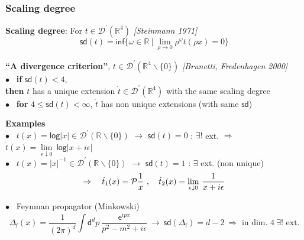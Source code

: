 \documentclass[9pt]{beamer}
\newcommand{\abs}[1]{\left|{#1}\right|} %
\newcommand{\E}{\mathsf{e}} %
\newcommand{\logar}{\mathsf{log}} %
\renewcommand{\inf}{\mathsf{inf}} %
\newcommand{\sd}{\mathsf{sd}} %
\newcommand{\citebeam}[1]{\textit{\textcolor{black!60!white}{[#1]}}} %
\newcommand{\Dcal}{\mathcal{D}}
\newcommand{\Pcal}{\mathcal{P}}
\newcommand{\Rbb}{\mathbb{R}}
\newcommand{\dsf}{\mathsf{d}}
\newcommand{\fsf}{\mathsf{f}}
\begin{document}

\begin{frame}

\frametitle{Scaling degree}

\vfill

\textbf{Scaling degree}: For $t \in \Dcal^\prime(\Rbb^4)$ \citebeam{Steinmann 1971} 
\\[-15pt]
\begin{equation*}
\sd(t) = \inf \{\omega\in\Rbb \ | \ \lim_{\rho \to 0}\rho^\omega t(\rho x)=0 \} 
\end{equation*}

\vspace*{-8pt}

\begin{block}{}
\vspace*{-10pt}
\textbf{``A divergence criterion''}, $t \in \Dcal^\prime(\Rbb^4\backslash\{0\})$ \quad \citebeam{Brunetti, Fredenhagen 2000} \\
$\bullet$ \ \textbf{if} $\sd(t) < 4$, \\
\hspace*{8pt} \textbf{then} $t$ has a unique extension $\dot{t} \in \Dcal^\prime(\Rbb^4)$ with the same scaling degree \\
$\bullet$ \ \textbf{for} $4 \leq \sd(t) < \infty$, $\dot{t}$ has non unique extensions (with same $\sd$)
\end{block}

\vspace*{-4pt}

\textbf{Examples} \\[2pt]

$\bullet$ \ $t(x) = \logar\abs{x} \in \Dcal^\prime(\Rbb\backslash\{0\})$ $\to$ $\sd(t) = 0$ : $\exists!$ ext. $\Rightarrow$ $\dot{t}(x) = \underset{\epsilon \downarrow 0}{\lim} \ \logar\abs{x+i\epsilon}$ \\

$\bullet$ \ $t(x) = \abs{x}^{-1} \in \Dcal^\prime(\Rbb\backslash\{0\})$ $\to$ $\sd(t) = 1$ : $\exists$ ext. (non unique) \\
\vspace*{-14pt}
\begin{equation*}
\Rightarrow \quad \dot{t}_1(x) = \Pcal\frac1x \ , \quad \dot{t}_2(x) = \underset{\epsilon \downarrow 0}{\lim} \ \frac{1}{x + i \epsilon}
\vspace*{-2pt}
\end{equation*}

$\bullet$ \ Feynman propagator (Minkowski)
\vspace*{-10pt}
\begin{equation*}
\Delta_\fsf(x) = \frac{1}{(2\pi)^d} \int \dsf^dp \ \frac{\E^{ipx}}{p^2-m^2+i\epsilon} \ \to \ \sd(\Delta_\fsf)=d-2 \ \Rightarrow \mbox{ in dim. } 4 \ \exists! \mbox{ ext.} 
\end{equation*}
 
\end{frame}
\end{document}
